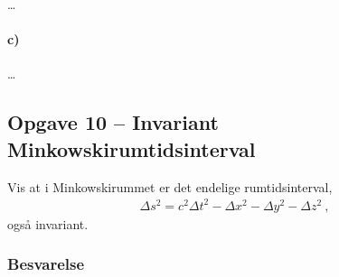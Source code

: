 \documentclass[../main.tex]{subfiles}
\begin{document}
\ldots



\paragraph{c)}

\ldots




\subsection{Opgave 10 -- Invariant Minkowskirumtidsinterval}
\setcounter{subsection}{10}
\setcounter{equation}{0}

Vis at i Minkowskirummet er det endelige rumtidsinterval,
\begin{align}
    \Delta s^2 = c^2 \Delta t^2 - \Delta x^2 - \Delta y^2 - \Delta z^2 \: ,
\end{align}
også invariant.


\subsubsection{Besvarelse}
\end{document}
